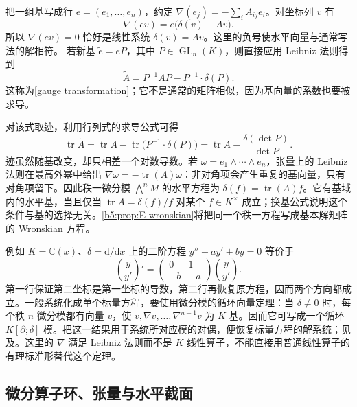 \ProseParagraphBreak
把一组基写成行 \(e=(e_1,\ldots,e_n)\)，约定 \(\nabla(e_j)=-\sum_i A_{ij}e_i\)。对坐标列 \(v\) 有
\begin{equation}\label{b5:eq:E-horizontal-system}
	\nabla(ev)=e\bigl(\delta(v)-Av\bigr).
\end{equation}
所以 \(\nabla(ev)=0\) 恰好是线性系统 \(\delta(v)=Av\)。这里的负号使水平向量与通常写法的解相符。 若新基 \(\widetilde e=eP\)，其中 \(P\in\operatorname{GL}_n(K)\)，则直接应用 Leibniz 法则得到
\begin{equation}\label{b5:eq:E-gauge-change}
	\widetilde A=P^{-1}AP-P^{-1}\cdot\delta(P).
\end{equation}
这称为[gauge transformation]；它不是通常的矩阵相似，因为基向量的系数也要被求导。

对该式取迹，利用行列式的求导公式可得
\[
	\operatorname{tr}\widetilde A =\operatorname{tr}A-\operatorname{tr}\bigl(P^{-1}\cdot\delta(P)\bigr) =\operatorname{tr}A-\frac{\delta(\det P)}{\det P}.
\]
迹虽然随基改变，却只相差一个对数导数。若 \(\omega=e_1\wedge\cdots\wedge e_n\)，张量上的 Leibniz 法则在最高外幂中给出 \(\nabla\omega=-\operatorname{tr}(A)\omega\)：非对角项会产生重复的基向量，只有对角项留下。因此秩一微分模 \(\bigwedge^nM\) 的水平方程为 \(\delta(f)=\operatorname{tr}(A)f\)。它有基域内的水平基，当且仅当 \(\operatorname{tr}A=\delta(f)/f\) 对某个 \(f\in K^\times\) 成立；换基公式说明这个条件与基的选择无关。\cref{b5:prop:E-wronskian}将把同一个秩一方程写成基本解矩阵的 Wronskian 方程。

\ProseParagraphBreak
例如 \(K=\mathbb C(x)\)、\(\delta=\mathrm{d}/\mathrm{d}x\) 上的二阶方程 \(y''+ay'+by=0\) 等价于
\[
	\binom{y}{y'}'=\begin{pmatrix}0&1\\-b&-a\end{pmatrix}\binom{y}{y'}.
\]
第一行保证第二坐标是第一坐标的导数，第二行再恢复原方程，因而两个方向都成立。一般系统化成单个标量方程，要使用微分模的循环向量定理：当 \(\delta\ne0\) 时，每个秩 \(n\) 微分模都有向量 \(v\)，使 \(v,\nabla v,\ldots,\nabla^{n-1}v\) 为 \(K\) 基。因而它可写成一个循环 \(K[\partial;\delta]\) 模。把这一结果用于系统所对应模的对偶，便恢复标量方程的解系统；见\cite[Theorem 1.2.8 and Corollary 1.2.9, pp. 6--7]{Singer2009DifferentialGalois}及\cite[Section 2.1]{VanDerPutSinger2003GaloisTheory}。这里的 \(\nabla\) 满足 Leibniz 法则而不是 \(K\) 线性算子，不能直接用普通线性算子的有理标准形替代这个定理。

\subsection{微分算子环、张量与水平截面}
\label{b5:subsec:E01:02}

